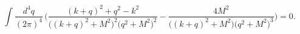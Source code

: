 \begin{equation}
\int \frac{d^4q}{(2\pi)^4}\,
\Bigg(\frac{(k+q)^2+q^2-k^2}{
\Big((k+q)^2+M^2\Big)^2 \Big(q^2+M^2\Big)^2}
- \frac{4 M^2}{\Big((k+q)^2+M^2\Big) \Big(q^2+M^2\Big)^3}\Bigg) = 0.
\end{equation}

